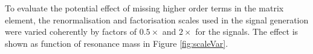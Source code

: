 
To evaluate the potential effect of missing higher order terms in the matrix element, the renormalisation and factorisation scales used in the signal generation were varied coherently by factors of $0.5\times$ and $2\times$ for the signals. The effect is shown as function of resonance mass in Figure \ref{fig:scaleVar}.

